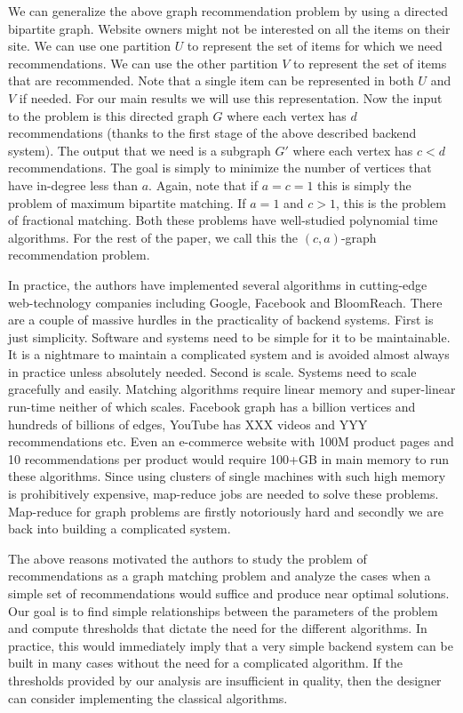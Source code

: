 We can generalize the above graph recommendation problem by using a directed bipartite graph.
Website owners might not be interested on all the items on their site. We can use one partition $U$
to represent the set of items for which we need recommendations. We can use the other partition $V$
to represent the set of items that are recommended. Note that a single item can be represented in
both $U$ and $V$ if needed. For our main results we will use this representation. Now the input
to the problem is this directed graph $G$ where each vertex has $d$ recommendations (thanks to the
first stage of the above described backend system). The output that we need is a subgraph $G'$
where each vertex has $c < d$ recommendations. The goal is simply to minimize the number of vertices
that have in-degree less than $a$. Again, note that if $a=c=1$ this is simply the problem of
maximum bipartite matching\cite{}. If $a=1$ and $c > 1$, this is the problem of fractional
matching\cite{}. Both these problems have well-studied polynomial time algorithms\cite{}. For the
rest of the paper, we call this the $(c, a)$-graph recommendation problem. \vs

In practice, the authors have implemented several algorithms in cutting-edge web-technology companies
including Google, Facebook and BloomReach. There are a couple of massive hurdles in the practicality
of backend systems. First is just simplicity. Software and systems need to be simple for it to be
maintainable. It is a nightmare to maintain a complicated system and is avoided almost always
in practice unless absolutely needed. Second is scale. Systems need to scale gracefully and easily. Matching
algorithms require linear memory and super-linear run-time neither of which scales. Facebook graph has
a billion vertices\cite{} and hundreds of billions of edges\cite{},
YouTube has XXX videos and YYY recommendations\cite{} etc. Even an e-commerce website with 100M product
pages and 10 recommendations per product would require 100+GB in main memory to run these algorithms. Since
using clusters of single machines with such high memory is prohibitively expensive, map-reduce\cite{} jobs
are needed to solve these problems. Map-reduce for graph problems are firstly notoriously hard and secondly
we are back into building a complicated system. \vs

The above reasons motivated the authors to study the problem of recommendations as a graph matching
problem and analyze the cases when a simple set of recommendations would suffice and produce near optimal
solutions. Our goal is to find simple relationships between the parameters of the problem and compute
thresholds that dictate the need for the different algorithms. In practice, this would immediately imply
that a very simple backend system can be built in many cases without the need for a complicated algorithm.
If the thresholds provided by our analysis are insufficient in quality,
then the designer can consider implementing the classical algorithms.


\fi